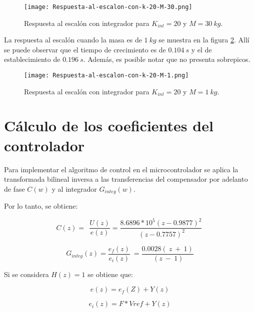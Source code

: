 \begin{figure}[H]
	\centering
	\texttt{[image: Respuesta-al-escalon-con-k-20-M-30.png]}
	\caption{Respuesta al escalón con integrador para $K_{int} =20$ y $M = 30\:kg$.}
	\label{fig:respuesta-al-escalon-con-k-20-M-30}
\end{figure}


\noindent La respuesta al escal\'{o}n cuando la masa es de $1\:kg$ se muestra en la figura \ref{fig:respuesta-al-escalon-con-k-20-M-1}. All\'{i} se puede observar que el tiempo de crecimiento es de $0.104\:s$ y el de establecimiento de $0.196\:s$. Adem\'{a}s, es posible notar que no presenta sobrepicos.



\begin{figure}[H]
	\centering
	\texttt{[image: Respuesta-al-escalon-con-k-20-M-1.png]}
	\caption{Respuesta al escalón con integrador para $K_{int} =20$ y $M=1\:kg$.}
	\label{fig:respuesta-al-escalon-con-k-20-M-1}
\end{figure}


\section{Cálculo de los coeficientes del controlador}

\noindent Para implementar el algoritmo de control en el microcontrolador se aplica la transformada bilineal inversa a las transferencias del compensador por adelanto de fase $C(w)$ y al integrador $G_{integ}(w)$.

\noindent Por lo tanto, se obtiene:

\begin{equation} \label{GrindEQ__5_6_} 
	C(z)=\ \ \frac{U(z)}{e(z)}=\frac{8.6896*10^5(z-0.9877)^2}{\ (z-0.7757)^2}\  
\end{equation} 

\begin{equation} \label{GrindEQ__5_7_} 
	G_{integ}(z)=\frac{e_f(z)}{e_i(z)}\ =\frac{0.0028(\ z\ +\ 1)}{\ (z\ -\ 1)} 
\end{equation} 

\noindent Si se considera $H(z)=1$ se obtiene que:

\begin{equation} \label{GrindEQ__5_39_} 
	e(z)=e_f(Z)+Y(z) 
\end{equation} 

\begin{equation} \label{GrindEQ__5_40_} 
	e_i(z)=F*Vref+Y(z) 
\end{equation} 



